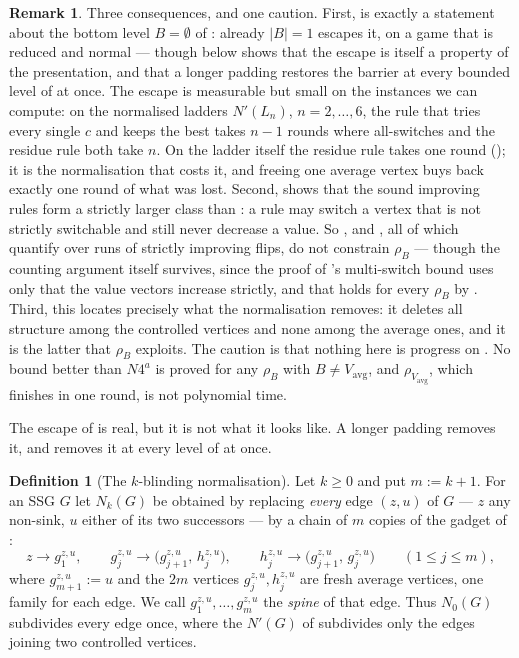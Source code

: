 \documentclass[11pt]{article}
\theoremstyle{plain}
\theoremstyle{definition}
\newtheorem{definition}[theorem]{Definition}
\newtheorem{remark}[theorem]{Remark}
\newcommand{\Vavg}{V_{\mathrm{avg}}}
\begin{document}
\begin{remark}\label{rem:freeze}
Three consequences, and one caution.
First,  is exactly a statement about the
bottom level $B=\emptyset$ of : already
$|B|=1$ escapes it, on a game that is reduced and normal --- though
 below shows that the escape is itself a
property of the presentation, and that a longer padding restores the
barrier at every bounded level of  at once. The escape is
measurable but small on the instances we can compute: on the normalised
ladders $N'(L_n)$, $n=2,\dots,6$, the rule that tries every single $c$ and
keeps the best takes $n-1$ rounds where all-switches and the residue rule
both take $n$. On the ladder itself the residue rule takes one round
(); it is the normalisation that costs it, and
freeing one average vertex buys back exactly one round of what was lost.
Second,  shows that the sound improving rules
form a strictly larger class than : a rule may switch a
vertex that is not strictly switchable and still never decrease a value.
So ,  and
, all of which quantify over runs of strictly
improving flips, do not constrain $\rho_B$ --- though the counting
argument itself survives, since the proof of 's
multi-switch bound uses only that the value vectors increase strictly,
and that holds for every $\rho_B$ by .
Third, this locates precisely what the normalisation removes: it deletes
all structure among the controlled vertices and none among the average
ones, and it is the latter that $\rho_B$ exploits.
The caution is that nothing here is progress on . No
bound better than $N4^{a}$ is proved for any $\rho_B$ with $B\ne\Vavg$,
and $\rho_{\Vavg}$, which finishes in one round, is not polynomial time.
\end{remark}

The escape of  is real, but it is not what it
looks like. A longer padding removes it, and removes it at every level of
 at once.

\begin{definition}[The $k$-blinding normalisation]\label{def:kblind}
Let $k\ge0$ and put $m:=k+1$. For an SSG $G$ let $N_k(G)$ be obtained by
replacing \emph{every} edge $(z,u)$ of $G$ --- $z$ any non-sink, $u$
either of its two successors --- by a chain of $m$ copies of the gadget
of :
\[
  z\to g^{z,u}_1,\qquad
  g^{z,u}_j\to\bigl(g^{z,u}_{j+1},\,h^{z,u}_j\bigr),\qquad
  h^{z,u}_j\to\bigl(g^{z,u}_{j+1},\,g^{z,u}_j\bigr)
  \qquad(1\le j\le m),
\]
where $g^{z,u}_{m+1}:=u$ and the $2m$ vertices $g^{z,u}_j,h^{z,u}_j$ are
fresh average vertices, one family for each edge. We call
$g^{z,u}_1,\dots,g^{z,u}_m$ the \emph{spine} of that edge. Thus
$N_0(G)$ subdivides every edge once, where the $N'(G)$ of
 subdivides only the edges joining two controlled
vertices.
\end{definition}
\end{document}
